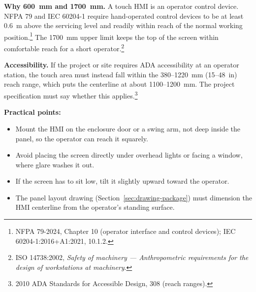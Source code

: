 \textbf{Why 600~mm and 1700~mm.} A touch HMI is an operator control device. NFPA 79 and IEC 60204-1 require hand-operated control devices to be at least 0.6~m above the servicing level and readily within reach of the normal working position.\footnote{NFPA 79-2024, Chapter 10 (operator interface and control devices); IEC 60204-1:2016+A1:2021, 10.1.2.} The 1700~mm upper limit keeps the top of the screen within comfortable reach for a short operator.\footnote{ISO 14738:2002, \emph{Safety of machinery --- Anthropometric requirements for the design of workstations at machinery}.}

\textbf{Accessibility.} If the project or site requires ADA accessibility at an operator station, the touch area must instead fall within the 380--1220~mm (15--48~in) reach range, which puts the centerline at about 1100--1200~mm. The project specification must say whether this applies.\footnote{2010 ADA Standards for Accessible Design, 308 (reach ranges).}

\textbf{Practical points:}
\begin{itemize}[itemsep=2pt]
  \item Mount the HMI on the enclosure door or a swing arm, not deep inside the panel, so the operator can reach it squarely.
  \item Avoid placing the screen directly under overhead lights or facing a window, where glare washes it out.
  \item If the screen has to sit low, tilt it slightly upward toward the operator.
  \item The panel layout drawing (Section~\ref{sec:drawing-package}) must dimension the HMI centerline from the operator's standing surface.
\end{itemize}

